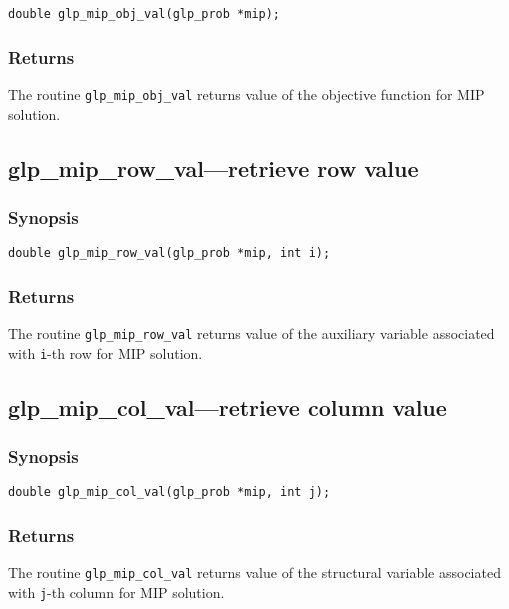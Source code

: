 \begin{verbatim}
double glp_mip_obj_val(glp_prob *mip);
\end{verbatim}

\subsubsection*{Returns}

The routine \verb|glp_mip_obj_val| returns value of the objective
function for MIP solution.

\subsection{glp\_mip\_row\_val---retrieve row value}

\subsubsection*{Synopsis}

\begin{verbatim}
double glp_mip_row_val(glp_prob *mip, int i);
\end{verbatim}

\subsubsection*{Returns}

The routine \verb|glp_mip_row_val| returns value of the auxiliary
variable associated with \verb|i|-th row for MIP solution.

\subsection{glp\_mip\_col\_val---retrieve column value}

\subsubsection*{Synopsis}

\begin{verbatim}
double glp_mip_col_val(glp_prob *mip, int j);
\end{verbatim}

\subsubsection*{Returns}

The routine \verb|glp_mip_col_val| returns value of the structural
variable associated with \verb|j|-th column for MIP solution.

